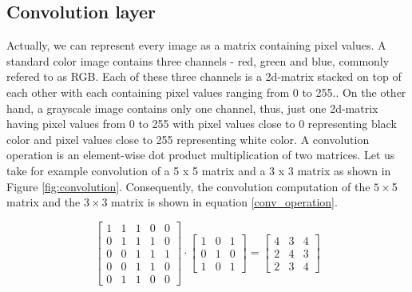 \documentclass[master]{thesis-uestc}
\begin{document}

\subsection*{Convolution layer}
Actually, we can represent every image as a matrix containing pixel values. A standard color image contains three channels - red, green and blue, commonly refered to as RGB. Each of these three channels is a 2d-matrix stacked on top of each other with each containing pixel values ranging from 0 to 255.. On the other hand, a grayscale image contains only one channel, thus, just one 2d-matrix having pixel values from 0 to 255 with pixel values close to 0 representing black color and pixel values close to 255 representing white color. A convolution operation is an element-wise dot product multiplication of two matrices. Let us take for example convolution of a 5 x 5 matrix and a 3 x 3 matrix as shown in Figure \ref{fig:convolution}. Consequently, the convolution computation of the $5 \times $5 matrix and the $3 \times $3 matrix is shown in equation \ref{conv_operation}.

\begin{equation}
\begin{bmatrix}
1 & 1 & 1 & 0 & 0 \\
0 & 1 & 1 & 1 & 0 \\
0 & 0 & 1 & 1 & 1 \\
0 & 0 & 1 & 1 & 0 \\
0 & 1 & 1 & 0 & 0
\end{bmatrix}
\cdot
\begin{bmatrix}
1 & 0 & 1 \\
0 & 1 & 0 \\
1 & 0 & 1
\end{bmatrix}
=
\begin{bmatrix}
4 & 3 & 4 \\
2 & 4 & 3 \\
2 & 3 & 4
\end{bmatrix}
\label{conv_operation}
\end{equation}
\end{document}
